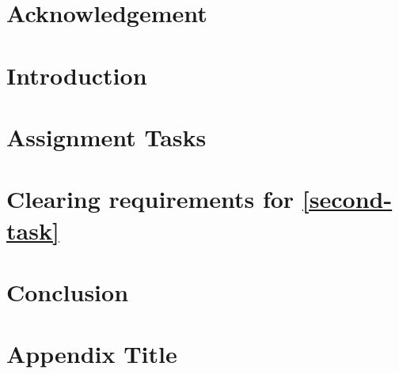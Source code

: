 \documentclass[12pt]{report}
\begin{document}




\chapter*{Acknowledgement}


\tableofcontents
\listoffigures
\listoftables

\chapter{Introduction}


\chapter{Assignment Tasks}



\chapter{Clearing requirements for \ref{second-task}}









\chapter{Conclusion}


\appendix
\chapter{Appendix Title}


\printbibliography

\listoftodos
\end{document}

